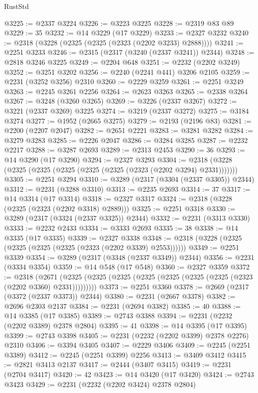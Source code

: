 \begin{lexlean}{RustStd}
\begin{coremodule}
@3225 := @2337 @3224
@3226 := @3223 @3225
@3228 := @2319 @83 @89
@3229 := 35
@3232 := @14 @3229 (@17 @3229)
@3233 := @2327 @3232
@3240 := @2318 (@3228 (@2325 (@2325 (@2323 (@2202 @3233) @2888))))
@3241 := @2251 @3233
@3246 := @2315 (@2317 (@3240 (@2337 @3241)) @2344)
@3248 := @2818 @3246 @3225
@3249 := @2204 @648
@3251 := @2232 (@2202 @3249)
@3252 := @3251 @3202
@3256 := @2240 (@2241 @441) @3206 @2105
@3259 := @2231 (@3252 @3256) @2310
@3260 := @2229 @3259
@3261 := @2251 @3249
@3263 := @2245 @3261 @2256
@3264 := @2623 @3263
@3265 := @2338 @3264
@3267 := @3248 (@3260 @3265)
@3269 := @3226 (@2337 @3267)
@3272 := @3221 (@2337 @3269) @3225
@3274 := @3219 (@2337 @3272)
@3275 := @3184 @3274
@3277 := @1952 (@2665 @3275)
@3279 := @2193 (@2196 @83)
@3281 := @2200 (@2207 @2047)
@3282 := @2651 @2221
@3283 := @3281 @3282
@3284 := @3279 @3283
@3285 := @2226 @2047
@3286 := @3284 @3285
@3287 := @2232 @2217
@3288 := @3287 @2693
@3289 := @2313 @2453
@3290 := 36
@3293 := @14 @3290 (@17 @3290)
@3294 := @2327 @3293
@3304 := @2318 (@3228 (@2325 (@2325 (@2325 (@2325 (@2325 (@2323 (@2202 @3294) @2331)))))))
@3305 := @2251 @3294
@3310 := @3289 (@2317 (@3304 (@2337 @3305)) @2344)
@3312 := @2231 (@3288 @3310)
@3313 := @2235 @2693
@3314 := 37
@3317 := @14 @3314 (@17 @3314)
@3318 := @2327 @3317
@3324 := @2318 (@3228 (@2325 (@2323 (@2202 @3318) @2889)))
@3325 := @2251 @3318
@3330 := @3289 (@2317 (@3324 (@2337 @3325)) @2344)
@3332 := @2231 (@3313 @3330)
@3333 := @2232 @2433
@3334 := @3333 @2693
@3335 := 38
@3338 := @14 @3335 (@17 @3335)
@3339 := @2327 @3338
@3348 := @2318 (@3228 (@2325 (@2325 (@2325 (@2325 (@2323 (@2202 @3339) @2553))))))
@3349 := @2251 @3339
@3354 := @3289 (@2317 (@3348 (@2337 @3349)) @2344)
@3356 := @2231 (@3334 @3354)
@3359 := @14 @548 (@17 @548)
@3360 := @2327 @3359
@3372 := @2318
    (@2671 (@2325 (@2325 (@2325 (@2325 (@2325 (@2325 (@2325 (@2323 (@2202 @3360) @2331)))))))))
@3373 := @2251 @3360
@3378 := @2669 (@2317 (@3372 (@2337 @3373)) @2344)
@3380 := @2231 (@2667 @3378)
@3382 := @2696 @2303 @2137
@3384 := @2231 (@2694 @3382)
@3385 := 40
@3388 := @14 @3385 (@17 @3385)
@3389 := @2743 @3388
@3394 := @2231 (@2232 (@2202 @3389) @2378 @2804)
@3395 := 41
@3398 := @14 @3395 (@17 @3395)
@3399 := @2743 @3398
@3405 := @2231 (@2232 (@2202 @3399) @2378 @2276) @2310
@3406 := @3394 @3405
@3407 := @2229 @3406
@3409 := @2245 (@2251 @3389)
@3412 := @2245 (@2251 @3399) @2256
@3413 := @3409 @3412
@3415 := @2821 @3413 @2137
@3417 := @2444 (@3407 @3415)
@3419 := @2231 (@2704 @3417)
@3420 := 42
@3423 := @14 @3420 (@17 @3420)
@3424 := @2743 @3423
@3429 := @2231 (@2232 (@2202 @3424) @2378 @2804)

\end{coremodule}
\end{lexlean}
